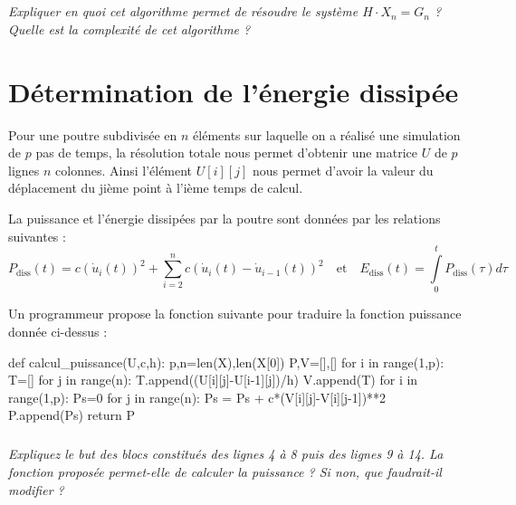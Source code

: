 \documentclass[10pt]{article}
\newif\ifprof
\begin{document}
\fi

\subparagraph{}
\textit{Expliquer en quoi cet algorithme permet de résoudre le système $H\cdot X_n = G_n$ ? Quelle est la complexité de cet algorithme ?}
\ifprof
\begin{corrige}
La matrice étant tridiagonale, la phase d'échelonnage et de remontée sont simplifiées. 
\end{corrige}
\else
\fi


\section{Détermination de l'énergie dissipée}
\ifprof
\else

Pour une poutre subdivisée en $n$ éléments sur laquelle on a réalisé une simulation de $p$ pas de temps, la résolution totale nous permet d'obtenir une matrice $U$ de $p$ lignes $n$ colonnes. Ainsi l'élément $U[i][j]$ nous permet d'avoir la valeur du déplacement du jième point à l'ième temps de calcul.

La puissance et l'énergie dissipées par la poutre sont données par les relations suivantes :
$$
P_{\text{diss}}(t) = c(\dot{u}_i(t))^2 + \sum\limits_{i=2}^n c\left(\dot{u}_i(t) - \dot{u}_{i-1}(t)\right)^2
\quad \text{et} \quad 
E_{\text{diss}}(t) = \int\limits_{0}^t P_{\text{diss}}(\tau) d\tau
$$


Un programmeur propose la fonction suivante pour traduire la fonction puissance donnée ci-dessus :
\begin{py}
\begin{python}
def calcul_puissance(U,c,h):
    p,n=len(X),len(X[0])
    P,V=[],[]
    for i in range(1,p):
        T=[]
        for j in range(n):
            T.append((U[i][j]-U[i-1][j])/h)
        V.append(T)
    for i in range(1,p):
        Ps=0
        for j in range(n):
                Ps = Ps + c*(V[i][j]-V[i][j-1])**2
        P.append(Ps)
    return P
\end{python}
\end{py}

\fi

\subparagraph{}
\textit{Expliquez le but des blocs constitués des lignes 4 à 8 puis des lignes 9 à 14. La fonction proposée permet-elle de calculer la puissance ? Si non, que faudrait-il modifier ? }
\ifprof
\begin{corrige}
La puissance devant être calculée à partir de la vitesse, les lignes 4 à 8 permettent de calculer la vitesse par différence de position sur un temps $h$. La vitesse d'un n\oe{}ud $j$ à l'instant $i$ est donc calculée par $\dfrac{U[i][j]-U[i-1][j])}{h}$.

Les lignes 9 à 14 permettent de calculer la puissance, mais ne prennent pas en compte le cas où $i$ =0. Il faut donc que le range varie entre 0 et $p$ et traiter le cas où $p=0$ à l'aide d'un \textsf{if}. 
\end{corrige}
\else
\fi
\end{document}

